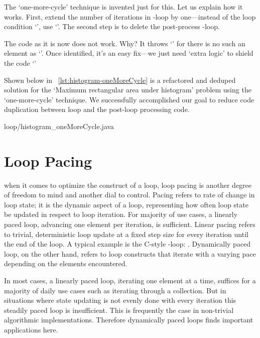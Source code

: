 The `one-more-cycle' technique is invented just for this.
Let us explain how it works.
First, extend the number of iterations in -loop by one---instead of the loop
condition `', use `'.
The second step is to delete the post-process -loop.


The code as it is now does not work.
Why?
It throws `' for there is no such an element as
`'.
Once identified, it's an easy fix---we just need `extra logic' to shield
the code `'


Shown below in ~\autoref{lst:histogram-oneMoreCycle} is
a refactored and deduped solution for the `Maximum rectangular area under
histogram' problem using the `one-more-cycle' technique.
We successfully accomplished our goal to
reduce code duplication between loop and the post-loop processing code.

{loop/histogram_oneMoreCycle.java}


\section{Loop Pacing}\label{sec:loop-pacing}

when it comes to optimize the construct of a loop, loop pacing is another degree of
freedom to mind and another dial to control.
Pacing refers to rate of change in loop state;
it is the dynamic aspect of a loop, representing how often loop state be updated in
respect to loop iteration.
For majority of use cases, a linearly paced loop, advancing one element per iteration, is
sufficient.
Linear pacing refers to trivial, deterministic loop update at a fixed step size for every
iteration until the end of the loop.
A typical example is the C-style -loop: .
Dynamically paced loop, on the other hand, refers to loop constructs that iterate
with a varying pace depending on the elements encountered.


In most cases, a linearly paced loop, iterating one element at a time, suffices
for a majority of daily use cases such as iterating through a collection.
But in situations where state updating is not evenly done with every iteration this steadily
paced loop is insufficient.
This is frequently the case in non-trivial algorithmic implementations.
Therefore dynamically paced loops finds important applications here.



